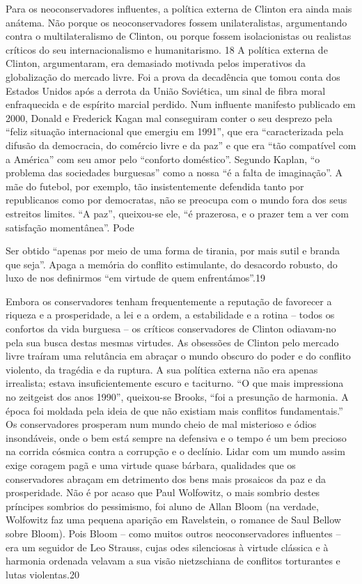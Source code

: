  \par 
Para os neoconservadores influentes, a política externa de Clinton era ainda mais anátema. Não porque os neoconservadores fossem unilateralistas, argumentando contra o multilateralismo de Clinton, ou porque fossem isolacionistas ou realistas críticos do seu internacionalismo e humanitarismo. {\color{blue}18} A política externa de Clinton, argumentaram, era demasiado motivada pelos imperativos da globalização do mercado livre. Foi a prova da decadência que tomou conta dos Estados Unidos após a derrota da União Soviética, um sinal de fibra moral enfraquecida e de espírito marcial perdido. Num influente manifesto publicado em 2000, Donald e Frederick Kagan mal conseguiram conter o seu desprezo pela “feliz situação internacional que emergiu em 1991”, que era “caracterizada pela difusão da democracia, do comércio livre e da paz” e que era “tão compatível com a América” com seu amor pelo “conforto doméstico”. Segundo Kaplan, “o problema das sociedades burguesas” como a nossa “é a falta de imaginação”. A mãe do futebol, por exemplo, tão insistentemente defendida tanto por republicanos como por democratas, não se preocupa com o mundo fora dos seus estreitos limites. “A paz”, queixou-se ele, “é prazerosa, e o prazer tem a ver com satisfação momentânea”. Pode
 \par 
Ser obtido “apenas por meio de uma forma de tirania, por mais sutil e branda que seja”. Apaga a memória do conflito estimulante, do desacordo robusto, do luxo de nos definirmos “em virtude de quem enfrentámos”.{\color{blue}19}
 \par 
Embora os conservadores tenham frequentemente a reputação de favorecer a riqueza e a prosperidade, a lei e a ordem, a estabilidade e a rotina – todos os confortos da vida burguesa – os críticos conservadores de Clinton odiavam-no pela sua busca destas mesmas virtudes. As obsessões de Clinton pelo mercado livre traíram uma relutância em abraçar o mundo obscuro do poder e do conflito violento, da tragédia e da ruptura. A sua política externa não era apenas irrealista; estava insuficientemente escuro e taciturno. “O que mais impressiona no zeitgeist dos anos 1990”, queixou-se Brooks, “foi a presunção de harmonia. A época foi moldada pela ideia de que não existiam mais conflitos fundamentais.” Os conservadores prosperam num mundo cheio de mal misterioso e ódios insondáveis, onde o bem está sempre na defensiva e o tempo é um bem precioso na corrida cósmica contra a corrupção e o declínio. Lidar com um mundo assim exige coragem pagã e uma virtude quase bárbara, qualidades que os conservadores abraçam em detrimento dos bens mais prosaicos da paz e da prosperidade. Não é por acaso que Paul Wolfowitz, o mais sombrio destes príncipes sombrios do pessimismo, foi aluno de Allan Bloom (na verdade, Wolfowitz faz uma pequena aparição em Ravelstein, o romance de Saul Bellow sobre Bloom). Pois Bloom – como muitos outros neoconservadores influentes – era um seguidor de Leo Strauss, cujas odes silenciosas à virtude clássica e à harmonia ordenada velavam a sua visão nietzschiana de conflitos torturantes e lutas violentas.{\color{blue}20}
